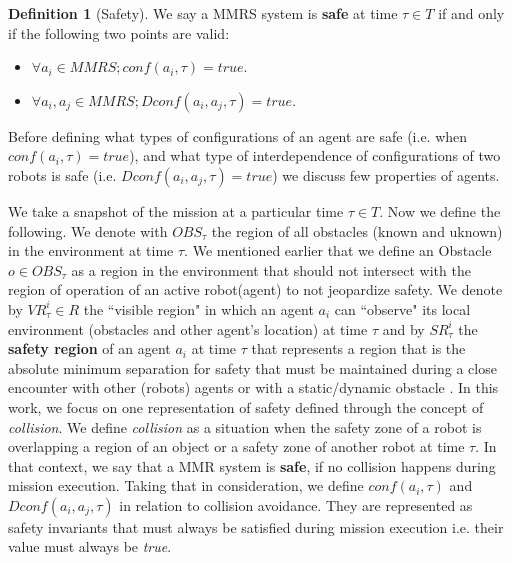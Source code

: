 \documentclass[journal]{IEEEtran}
\theoremstyle{definition}
\newtheorem{definition}{Definition}
\begin{document}
\begin{definition}[Safety]
We say a MMRS system is \textbf{safe} at time $\tau \in T$ if and only if the following two points are valid:
\begin{itemize}
\item  $\forall a_i \in MMRS; conf(a_i, \tau)=true$.
 \item  $\forall a_i,a_j \in MMRS; Dconf(a_i, a_j,\tau)=true$.
\end{itemize}
\end{definition}

Before defining what types of configurations of an agent are safe (i.e. when $conf(a_i, \tau)=true$), and what type of interdependence of configurations of two robots is safe (i.e. $Dconf(a_i, a_j,\tau)=true$) we discuss few properties of agents.

We take a snapshot of the mission at a particular time $\tau \in T$. Now we define the following.
We denote with $OBS_\tau$ the region of all obstacles (known and uknown) in the environment at time $\tau$. We mentioned earlier that we define an Obstacle $o \in OBS_\tau$ as a region in the environment that should not intersect with the region of operation of an active robot(agent) to not jeopardize safety. 
We denote by $VR_\tau^i \in R $ the ``visible region" in which an agent $a_i$ can ``observe" its local environment (obstacles and other agent's location) at time $\tau$ and by $SR_\tau^i$ the \textbf{safety region} of an agent $a_i$  at time $\tau$ that represents a region that is the  absolute  minimum  separation  for  safety that must  be  maintained  during  a close  encounter  with  other (robots) agents  or with  a static/dynamic obstacle . 
In this work, we focus on one representation of safety defined through the concept of \textit{collision}. We define \textit{collision} as a situation when the safety zone of a robot is overlapping a region of an object or a safety zone of another robot at time $\tau$. In that context, we say that a MMR system is \textbf{safe}, if no collision happens during mission execution. Taking that in consideration, we define $conf(a_i, \tau)$ and $Dconf(a_i, a_j,\tau)$ in relation to collision avoidance. They are represented as safety invariants that must always be satisfied during mission execution  i.e. their value must always be \textit{true}.




\end{document}
